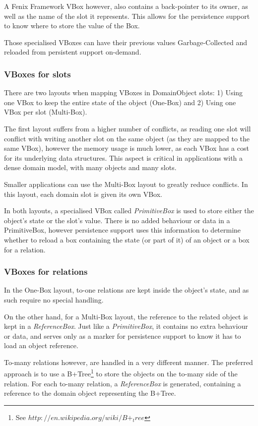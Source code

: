 A Fenix Framework VBox however, also contains a back-pointer to its
owner, as well as the name of the slot it represents. This allows for
the persistence support to know where to store the value of the Box.

Those specialised VBoxes can have their previous values
Garbage-Collected and reloaded from persistent support on-demand.

\subsubsection{VBoxes for slots}

There are two layouts when mapping VBoxes in DomainObject slots: 1)
Using one VBox to keep the entire state of the object (One-Box) and 2)
Using one VBox per slot (Multi-Box).

The first layout suffers from a higher number of conflicts, as reading
one slot will conflict with writing another slot on the same object
(as they are mapped to the same VBox), however the memory usage is
much lower, as each VBox has a cost for its underlying data
structures. This aspect is critical in applications with a dense
domain model, with many objects and many slots.

Smaller applications can use the Multi-Box layout to greatly reduce
conflicts. In this layout, each domain slot is given its own VBox.

In both layouts, a specialised VBox called {\it PrimitiveBox} is
used to store either the object's state or the slot's value. There is
no added behaviour or data in a PrimitiveBox, however persistence
support uses this information to determine whether to reload a box
containing the state (or part of it) of an object or a box for a relation.

\subsubsection{VBoxes for relations}

In the One-Box layout, to-one relations are kept inside the object's
state, and as such require no special handling. 

On the other hand, for a Multi-Box layout, the reference to the
related object is kept in a {\it ReferenceBox}. Just like a {\it
  PrimitiveBox}, it contains no extra behaviour or data, and serves
only as a marker for persistence support to know it has to load an
object reference.

To-many relations however, are handled in a very different manner. The
preferred approach is to use a B+Tree\footnote{See
  $http://en.wikipedia.org/wiki/B+_tree$} to store the objects on the
to-many side of the relation. For each to-many relation, a {\it
  ReferenceBox} is generated, containing a reference to the domain
object representing the B+Tree.

